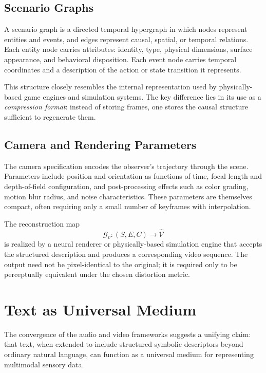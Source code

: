 \documentclass[12pt,a4paper]{article}
\theoremstyle{definition}
\theoremstyle{remark}
\begin{document}
\subsection{Scenario Graphs}

A scenario graph is a directed temporal hypergraph in which nodes represent entities and events, and edges represent causal, spatial, or temporal relations. Each entity node carries attributes: identity, type, physical dimensions, surface appearance, and behavioral disposition. Each event node carries temporal coordinates and a description of the action or state transition it represents.

This structure closely resembles the internal representation used by physically-based game engines and simulation systems. The key difference lies in its use as a \emph{compression format}: instead of storing frames, one stores the causal structure sufficient to regenerate them.

\subsection{Camera and Rendering Parameters}

The camera specification encodes the observer's trajectory through the scene. Parameters include position and orientation as functions of time, focal length and depth-of-field configuration, and post-processing effects such as color grading, motion blur radius, and noise characteristics. These parameters are themselves compact, often requiring only a small number of keyframes with interpolation.

The reconstruction map
\[
\mathcal{G}_v : (S, E, C) \rightarrow \widehat{\mathcal{V}}
\]
is realized by a neural renderer or physically-based simulation engine that accepts the structured description and produces a corresponding video sequence. The output need not be pixel-identical to the original; it is required only to be perceptually equivalent under the chosen distortion metric.

\section{Text as Universal Medium}
\label{sec:text_medium}

The convergence of the audio and video frameworks suggests a unifying claim: that text, when extended to include structured symbolic descriptors beyond ordinary natural language, can function as a universal medium for representing multimodal sensory data.
\end{document}
